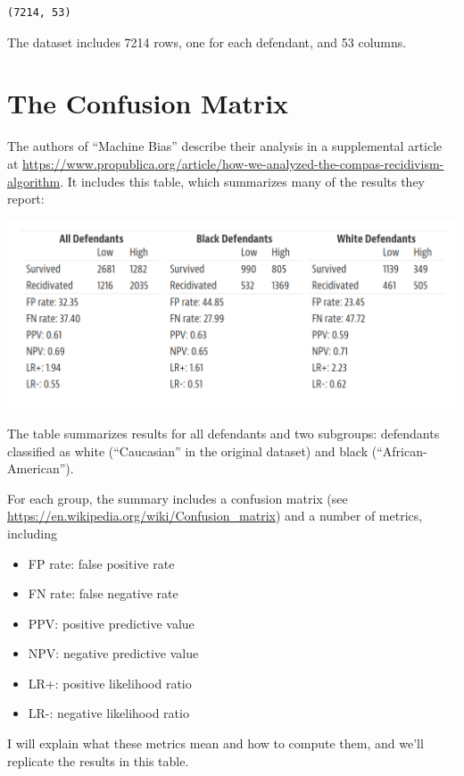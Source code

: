 \begin{lstlisting}[style=output]
(7214, 53)
\end{lstlisting}

The dataset includes 7214 rows, one for each defendant, and 53 columns.

\hypertarget{the-confusion-matrix}{%
\section{The Confusion Matrix}\label{the-confusion-matrix}}

The authors of ``Machine Bias'' describe their analysis in a
supplemental article at
\url{https://www.propublica.org/article/how-we-analyzed-the-compas-recidivism-algorithm}.
It includes this table, which summarizes many of the results they
report:

\includegraphics{figs/machine_bias_table.png}

The table summarizes results for all defendants and two subgroups:
defendants classified as white (``Caucasian'' in the original dataset)
and black (``African-American'').

For each group, the summary includes a confusion matrix (see
\url{https://en.wikipedia.org/wiki/Confusion_matrix}) and a number of
metrics, including

\begin{itemize}
\tightlist
\item
  FP rate: false positive rate
\item
  FN rate: false negative rate
\item
  PPV: positive predictive value
\item
  NPV: negative predictive value
\item
  LR+: positive likelihood ratio
\item
  LR-: negative likelihood ratio
\end{itemize}

I will explain what these metrics mean and how to compute them, and
we'll replicate the results in this table.

